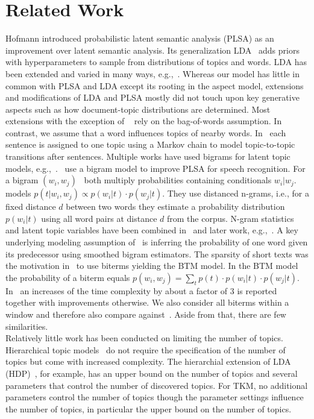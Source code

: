 \documentclass[twocolumn,10]{article}
\newcommand{\ci}{~\cite} \newcommand{\re}{~\ref} \newcommand{\ma}{\mathbb}
\begin{document}
	\section{Related Work} \label{sec:rel} %
	Hofmann \cite{hof99} introduced probabilistic latent semantic analysis (PLSA) as an improvement over latent semantic analysis. Its generalization LDA\ci{ble03} adds priors with hyperparameters to sample from distributions of topics and words. LDA has been extended and varied in many ways, e.g.,\ci{liw06,new11,das15,blei10,yan13,yan15,teh05}. Whereas our model has little in common with PLSA and LDA except its rooting in the aspect model, extensions and modifications of LDA and PLSA mostly did not touch upon key generative aspects such as how document-topic distributions are determined. Most extensions with the exception of \ci{gru07,bah10,nie07,hai13,wal06,wan07,yan13} rely on the bag-of-words assumption. In contrast, we assume that a word influences topics of nearby words. In\ci{gru07} each sentence is assigned to one topic using a Markov chain to model topic-to-topic transitions after sentences. Multiple works have used bigrams for latent topic models, e.g.,\ci{bah10,nie07,hai13,wal06}.\ci{bah10,nie07,hai13} use a bigram model to improve PLSA for speech recognition. For a bigram $(w_i,w_j)$\ci{bah10,nie07} both multiply probabilities containing conditionals $w_i|w_j$.\ci{hai13} models $p(t|w_i,w_j) \propto  p(w_i|t)\cdot p(w_j|t)$. They use distanced n-grams, i.e., for a fixed distance $d$ between two words they estimate a probability distribution $p(w_i|t)$ using all word pairs at distance $d$ from the corpus. N-gram statistics and latent topic variables have been combined in\ci{wal06} and later work, e.g.,\ci{wan07,yan13}. A key underlying modeling assumption of\ci{wal06} is inferring the probability of one word given its predecessor using smoothed bigram estimators. The sparsity of short texts was the motivation in\ci{yan13} to use biterms yielding the BTM model. In the BTM model the probability of a biterm equals $p(w_i,w_j) = \sum_t p(t)\cdot p(w_i|t)\cdot p(w_j|t)$. In\ci{yan13} an increases of the time complexity by about a factor of 3 is reported together with improvements otherwise. We also consider all biterms within a window and therefore also compare against\ci{yan13}. Aside from that, there are few similarities. \\	
	Relatively little work has been conducted on limiting the number of topics. Hierarchical topic models\ci{teh05,mim07,wan11} do not require the specification of the number of topics but come with increased complexity. The hierarchial extension of LDA (HDP)\ci{wan11}, for example, has an upper bound on the number of topics and several parameters that control the number of discovered topics. For TKM, no additional parameters control the number of topics though the parameter settings influence the number of topics, in particular the upper bound on the number of topics.\\
\end{document}
